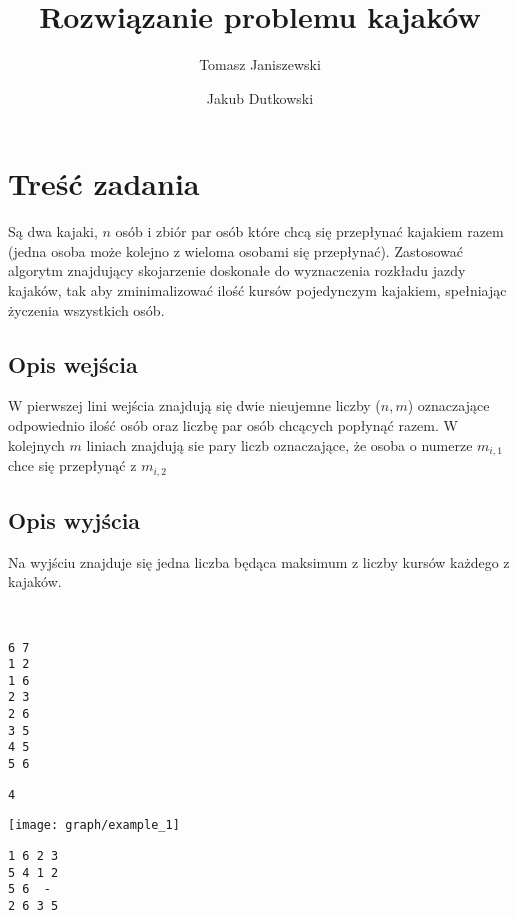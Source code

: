 \documentclass{llncs}
\begin{document}
\title{Rozwiązanie problemu kajaków}
%
%
\author{Tomasz Janiszewski \and Jakub Dutkowski}
%
%


\maketitle              %

%
\section{Treść zadania}
Są dwa kajaki, $n$ osób i zbiór par osób które chcą się
przepłynać kajakiem razem (jedna osoba może kolejno z wieloma osobami się
przepłynać). Zastosować algorytm znajdujący skojarzenie doskonałe do
wyznaczenia rozkładu jazdy kajaków, tak aby zminimalizować ilość kursów
pojedynczym kajakiem, spełniając życzenia wszystkich osób.

\subsection{Opis wejścia}
W pierwszej lini wejścia znajdują się dwie nieujemne liczby ($n, m$) oznaczające odpowiednio
ilość osób oraz liczbę par osób chcących popłynąć razem.
W kolejnych $m$ liniach znajdują sie pary liczb oznaczające, że osoba o numerze $m_{i,1}$ chce się
przepłynąć z $m_{i,2}$

\subsection{Opis wyjścia}
Na wyjściu znajduje się jedna liczba będąca maksimum z liczby kursów każdego z kajaków.


\begin{example}~\\
\begin{lstlisting}[title=Wejście]
6 7
1 2
1 6
2 3
2 6
3 5
4 5
5 6
\end{lstlisting}
\begin{lstlisting}[title=Wyjście]
4
\end{lstlisting}

\texttt{[image: graph/example\_1]}
\begin{lstlisting}[title=Przykładowy rozkład plywania]
1 6	2 3
5 4	1 2
5 6	 -
2 6	3 5
\end{lstlisting}

\end{example}
\end{document}
